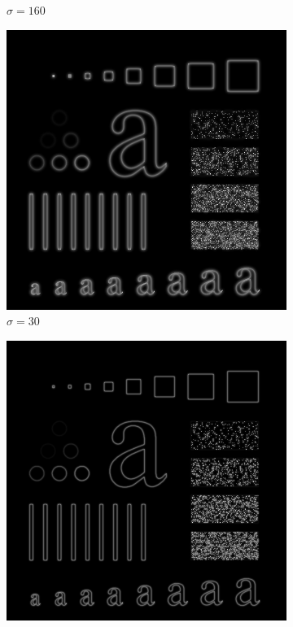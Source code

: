 \documentclass[
	12pt, %
]{style/fphw}
\begin{document}
\begin{figure}[H]
\begin{subfigure}[b]{.3\textwidth}
         \caption{$\sigma=160$}
         \label{Q5_2_highpass_filter_160}
     \end{subfigure}
     \vfill
     \begin{subfigure}[b]{.3\textwidth}
         \centering
         \includegraphics[width=\textwidth]{Q5_2_highpass_30.png}
         \caption{$\sigma=30$}
         \label{Q5_2_highpass_30}
     \end{subfigure}
     \hfill
     \begin{subfigure}[b]{.3\textwidth}
         \centering
         \includegraphics[width=\textwidth]{Q5_2_highpass_60.png}

\end{subfigure}
\end{figure}
\end{document}
